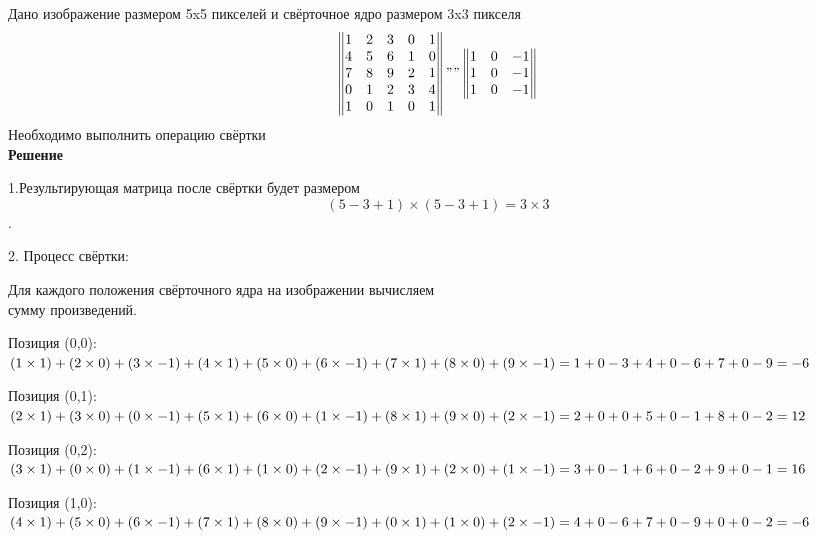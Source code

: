 \begin{description}
Дано изображение размером 5x5 пикселей и свёрточное ядро размером 3x3 пикселя\\

\begin{equation*}
\begin{Vmatrix}
1 & 2 & 3 & 0 & 1\\
4 & 5 & 6 & 1 & 0\\
7 & 8 & 9 & 2 & 1\\
0 & 1 & 2 & 3 & 4\\
1 & 0 & 1 & 0 & 1
\end{Vmatrix}
""
\begin{Vmatrix}
1 & 0 & -1\\
1 & 0 & -1\\
1 & 0 & -1
\end{Vmatrix}
\end{equation*}
Необходимо выполнить операцию свёртки\\
\textbf{Решение}

1.Результирующая матрица после свёртки будет размером
$$ (5-3+1) \times (5-3+1) = 3 \times 3 $$.

2. Процесс свёртки:

Для каждого положения свёрточного ядра на изображении вычисляем\\
сумму произведений.

Позиция (0,0):
$
(1 \times 1) + (2 \times 0) + (3 \times -1) + \\
(4 \times 1) + (5 \times 0) + (6 \times -1) + \\
(7 \times 1) + (8 \times 0) + (9 \times -1) = \\
1 + 0 - 3 + 4 + 0 - 6 + 7 + 0 - 9 = -6
$

 Позиция (0,1):
$
(2 \times 1) + (3 \times 0) + (0 \times -1) + \\
(5 \times 1) + (6 \times 0) + (1 \times -1) + \\
(8 \times 1) + (9 \times 0) + (2 \times -1) = \\
2 + 0 + 0 + 5 + 0 - 1 + 8 + 0 - 2 = 12
$

Позиция (0,2):
$
(3 \times 1) + (0 \times 0) + (1 \times -1) + \\
(6 \times 1) + (1 \times 0) + (2 \times -1) + \\
(9 \times 1) + (2 \times 0) + (1 \times -1) = \\
3 + 0 - 1 + 6 + 0 - 2 + 9 + 0 - 1 = 16
$

Позиция (1,0):
$
(4 \times 1) + (5 \times 0) + (6 \times -1) + \\
(7 \times 1) + (8 \times 0) + (9 \times -1) + \\
(0 \times 1) + (1 \times 0) + (2 \times -1) = \\
4 + 0 - 6 + 7 + 0 - 9 + 0 + 0 - 2 = -6
$


\end{description}
